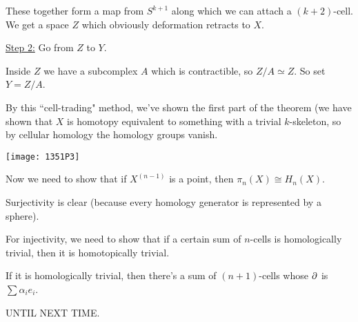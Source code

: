 \documentclass[x11names,reqno,14pt]{extarticle}
\begin{document}
These together form a map from $S^{k+1}$ along which we can attach a $(k + 2)$-cell. We get a space $Z$ which obviously deformation retracts to $X$. 

\underline{Step 2:} Go from $Z$ to $Y$. 

Inside $Z$ we have a subcomplex $A$ which is contractible, so $Z/A\simeq Z$. So set $Y = Z/A$.

By this ``cell-trading" method, we've shown the first part of the theorem (we have shown that $X$ is homotopy equivalent to something with a trivial $k$-skeleton, so by cellular homology the homology groups vanish. 

\texttt{[image: 1351P3]}

Now we need to show that if $X^{(n-1)}$ is a point, then $\pi_n(X) \cong H_n(X)$.

Surjectivity is clear (because every homology generator is represented by a sphere). 

For injectivity, we need to show that if a certain sum of $n$-cells is homologically trivial, then it is homotopically trivial. 

If it is homologically trivial, then there's a sum of $(n + 1)$-cells whose $\partial$ is $\sum \alpha_ie_i$. 

UNTIL NEXT TIME. 
\end{document}
